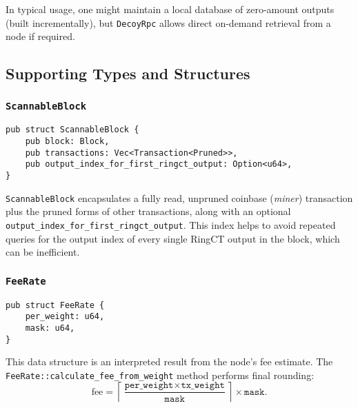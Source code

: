 \documentclass[12pt,a4paper]{article}
\begin{document}
In typical usage, one might maintain a local database of zero-amount outputs
(built incrementally), but \texttt{DecoyRpc} allows direct on-demand retrieval
from a node if required.

\subsection{Supporting Types and Structures}
\label{sec:monero-rpc-supporting-types}

\subsubsection{\texttt{ScannableBlock}}
\label{sec:monero-rpc-supporting-types-scannableblock}

\begin{verbatim}
pub struct ScannableBlock {
    pub block: Block,
    pub transactions: Vec<Transaction<Pruned>>,
    pub output_index_for_first_ringct_output: Option<u64>,
}
\end{verbatim}

\texttt{ScannableBlock} encapsulates a fully read, unpruned coinbase
(\textit{miner}) transaction plus the pruned forms of other transactions, along
with an optional \\\texttt{output\_index\_for\_first\_ringct\_output}.  This index
helps to avoid repeated queries for the output index of every single
RingCT output in the block, which can be inefficient.

\subsubsection{\texttt{FeeRate}}
\label{sec:monero-rpc-supporting-types-feerate}

\begin{verbatim}
pub struct FeeRate {
    per_weight: u64,
    mask: u64,
}
\end{verbatim}

This data structure is an interpreted result from the node’s fee estimate.
The \\\texttt{FeeRate::calculate\_fee\_from\_weight} method performs final rounding:
\[
\text{fee} = \left\lceil \frac{\texttt{per\_weight}
             \times \texttt{tx\_weight}}{\texttt{mask}} \right\rceil
             \times \texttt{mask}.
\]
\end{document}
